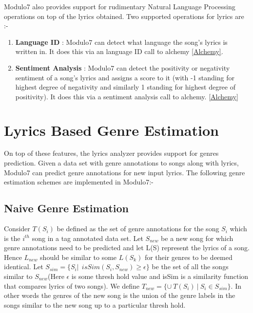 \noindent Modulo7 also provides support for rudimentary Natural Language Processing operations on top of the lyrics obtained. Two supported operations for lyrics are :-

\begin{enumerate}
\item \textbf{Language ID} : Modulo7 can detect what language the song's lyrics is written in. It does this via an language ID call to alchemy \ref{Alchemy}. 
\item \textbf{Sentiment Analysis} : Modulo7 can detect the positivity or negativity sentiment of a song's lyrics and assigns a score to it (with -1 standing for highest degree of negativity and similarly 1 standing for highest degree of positivity). It does this via a sentiment analysis call to alchemy. \ref{Alchemy}
\end{enumerate}

\section{Lyrics Based Genre Estimation} \label{genreestimation}

\noindent On top of these features, the lyrics analyzer provides support for genres prediction. Given a data set with genre annotations to songs along with lyrics, Modulo7 can predict genre annotations for new input lyrics. The following genre estimation schemes are implemented in Modulo7:-

\subsection{Naive Genre Estimation} \label{NaiveGenre}

\noindent Consider $T(S_i)$ be defined as the set of genre annotations for the song $S_i$ which is the $i^{th}$ song in a tag annotated data set. Let $S_{new}$ be a new song for which genre annotations need to be predicted and let L(S) represent the lyrics of a song. Hence $L_{new}$ should be similar to some $L(S_k)$ for their genres to be deemed identical. Let $S_{sim} = \{S_i | \ \ isSim(S_i, S_{new}) \geq \epsilon\} $ be the set of all the songs similar to $S_{new}$(Here $\epsilon$ is some thresh hold value and isSim is a similarity function that compares lyrics of two songs). We define $T_{new} = \{\cup \ T(S_i) \ | \ S_i \in S_{sim}\}$. In other words the genres of the new song is the union of the genre labels in the songs similar to the new song up to a particular thresh hold.

